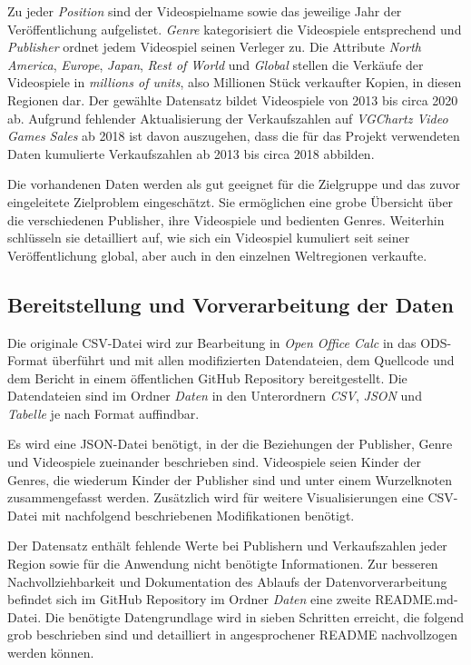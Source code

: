 \documentclass[usegeometry=true]{scrartcl}
\begin{document}
Zu jeder \textit{Position} sind der Videospielname sowie das jeweilige Jahr der Veröffentlichung aufgelistet. 
\textit{Genre} kategorisiert die Videospiele entsprechend und \textit{Publisher} ordnet jedem Videospiel seinen Verleger zu. 
Die Attribute \textit{North America}, \textit{Europe}, \textit{Japan}, \textit{Rest of World} und \textit{Global} stellen die Verkäufe der Videospiele in \textit{millions of units}, 
also Millionen Stück verkaufter Kopien, in diesen Regionen dar. 
Der gewählte Datensatz bildet Videospiele von 2013 bis circa 2020 ab. 
Aufgrund fehlender Aktualisierung der Verkaufszahlen auf \textit{VGChartz Video Games Sales} ab 2018 ist davon auszugehen, 
dass die für das Projekt verwendeten Daten kumulierte Verkaufszahlen ab 2013 bis circa 2018 abbilden. 

Die vorhandenen Daten werden als gut geeignet für die Zielgruppe und das zuvor eingeleitete Zielproblem eingeschätzt.
Sie ermöglichen eine grobe Übersicht über die verschiedenen Publisher, ihre Videospiele und bedienten Genres. 
Weiterhin schlüsseln sie detailliert auf, wie sich ein Videospiel kumuliert seit seiner Veröffentlichung global, 
aber auch in den einzelnen Weltregionen verkaufte. 

\subsection{Bereitstellung und Vorverarbeitung der Daten}
Die originale CSV-Datei wird zur Bearbeitung in \textit{Open Office Calc} in das ODS-Format überführt 
und mit allen modifizierten Datendateien, dem Quellcode und dem Bericht in einem öffentlichen GitHub Repository bereitgestellt. 
Die Datendateien sind im Ordner \textit{Daten} in den Unterordnern \textit{CSV}, \textit{JSON} und \textit{Tabelle} je nach Format auffindbar. 

Es wird eine JSON-Datei benötigt, in der die Beziehungen der Publisher, Genre und Videospiele zueinander beschrieben sind. 
Videospiele seien Kinder der Genres, die wiederum Kinder der Publisher sind und unter einem Wurzelknoten zusammengefasst werden. 
Zusätzlich wird für weitere Visualisierungen eine CSV-Datei mit nachfolgend beschriebenen Modifikationen benötigt. 

Der Datensatz enthält fehlende Werte bei Publishern und Verkaufszahlen jeder Region sowie für die Anwendung nicht benötigte Informationen. 
Zur besseren Nachvollziehbarkeit und Dokumentation des Ablaufs der Datenvorverarbeitung befindet sich im GitHub Repository im Ordner \textit{Daten} eine zweite README.md-Datei.
Die benötigte Datengrundlage wird in sieben Schritten erreicht, die folgend grob beschrieben sind und detailliert in angesprochener README nachvollzogen werden können.
\end{document}
